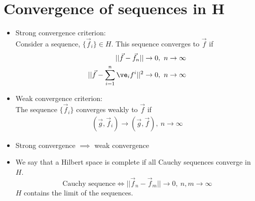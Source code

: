 \documentclass[cplx.tex]{subfiles}
\begin{document}
\section{Convergence of sequences in H}
\begin{itemize}
    \item Strong convergence criterion: \\
        Consider a sequence, $\{\vec{f}_i\} \in H$. This sequence converges to $\vec{f}$ if 
        \begin{align}
            ||\vec{f}-\vec{f}_n|| &\to 0,~ n\to\infty \\
            ||\vec{f}-\sum_{i=1}^n \ve_if^i||^2 &\to 0,~ n\to\infty
        \end{align}
    \item Weak convergence criterion: \\
        The sequence $\{\vec{f}_i\}$ converges weakly to $\vec{f}$ if
        \begin{align}
            (\vec{g},\vec{f}_i) \to (\vec{g},\vec{f}),~ n\to\infty
        \end{align}
    \item Strong convergence $\implies$ weak convergence
    \item We say that a Hilbert space is complete if all Cauchy sequences converge in $H$.
        \begin{equation}
            \text{Cauchy sequence} \iff ||\vec{f}_n-\vec{f}_m|| \to 0,~ n,m \to \infty
        \end{equation}
        $H$ contains the limit of the sequences.
\end{itemize}
\end{document}
